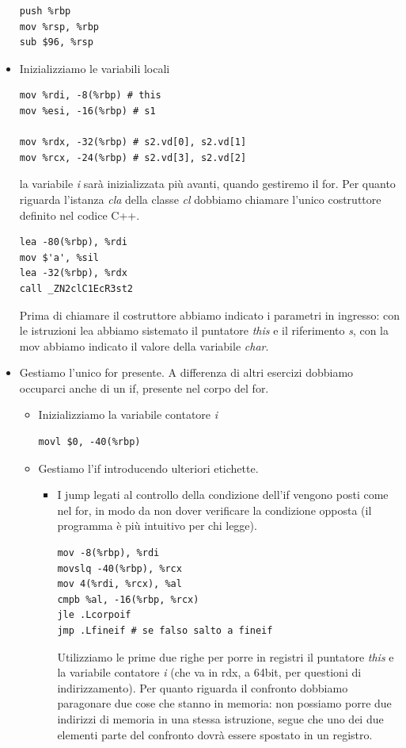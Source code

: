\documentclass[11pt]{report}
\theoremstyle{definition}
\begin{document}
\begin{itemize}
\begin{verbatim}
push %rbp
mov %rsp, %rbp
sub $96, %rsp
\end{verbatim}
\item Inizializziamo le variabili locali
\begin{verbatim}
mov %rdi, -8(%rbp) # this
mov %esi, -16(%rbp) # s1

mov %rdx, -32(%rbp) # s2.vd[0], s2.vd[1]
mov %rcx, -24(%rbp) # s2.vd[3], s2.vd[2]
\end{verbatim}
la variabile \emph{i} sarà inizializzata più avanti, quando gestiremo il for. Per quanto riguarda l'istanza \emph{cla} della classe \emph{cl} dobbiamo chiamare l'unico costruttore definito nel codice C++. 
\begin{verbatim}
lea -80(%rbp), %rdi
mov $'a', %sil
lea -32(%rbp), %rdx
call _ZN2clC1EcR3st2
\end{verbatim}
Prima di chiamare il costruttore abbiamo indicato i parametri in ingresso: con le istruzioni lea abbiamo sistemato il puntatore \emph{this} e il riferimento \emph{s}, con la mov abbiamo indicato il valore della variabile \emph{char}. 
\item Gestiamo l'unico for presente. A differenza di altri esercizi dobbiamo occuparci anche di un if, presente nel corpo del for.
\begin{itemize}
\item Inizializziamo la variabile contatore \emph{i}
\begin{verbatim}
movl $0, -40(%rbp)
\end{verbatim}
\item Gestiamo l'if introducendo ulteriori etichette. 
\begin{itemize}
\item I jump legati al controllo della condizione dell'if vengono posti come nel for, in modo da non dover verificare la condizione opposta (il programma è più intuitivo per chi legge).
\begin{verbatim}
mov -8(%rbp), %rdi
movslq -40(%rbp), %rcx 
mov 4(%rdi, %rcx), %al 
cmpb %al, -16(%rbp, %rcx)
jle .Lcorpoif
jmp .Lfineif # se falso salto a fineif
\end{verbatim}
Utilizziamo le prime due righe per porre in registri il puntatore \emph{this} e la variabile contatore \emph{i} (che va in rdx, a 64bit, per questioni di indirizzamento). Per quanto riguarda il confronto dobbiamo paragonare due cose che stanno in memoria: non possiamo porre due indirizzi di memoria in una stessa istruzione, segue che uno dei due elementi parte del confronto dovrà essere spostato in un registro.

\end{itemize}
\end{itemize}
\end{itemize}
\end{document}
